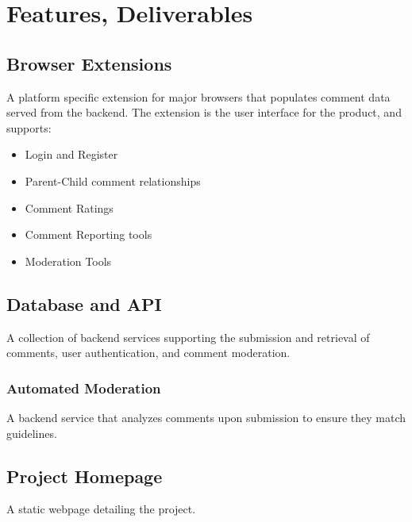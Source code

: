 \documentclass[proposal.tex]{subfiles}
\begin{document}
    
\section{Features, Deliverables}

\subsection{Browser Extensions}

A platform specific extension for major browsers that populates comment data served from the backend.
The extension is the user interface for the product, and supports:

\begin{itemize}
    \item Login and Register
    \item Parent-Child comment relationships
    \item Comment Ratings
    \item Comment Reporting tools
    \item Moderation Tools
\end{itemize}

\subsection{Database and API}

A collection of backend services supporting the submission and retrieval of comments, user authentication, and comment moderation.

\subsubsection{Automated Moderation}

A backend service that analyzes comments upon submission to ensure they match guidelines.

\subsection{Project Homepage}

A static webpage detailing the project.
\end{document}

